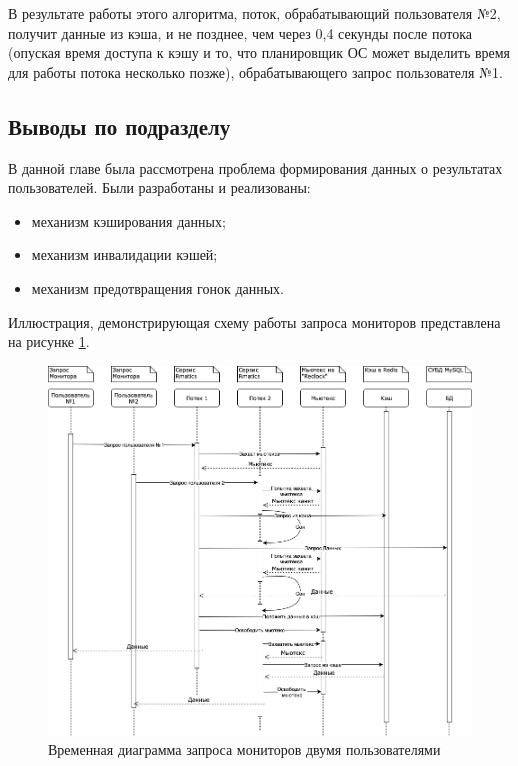 В результате работы этого алгоритма, поток, обрабатывающий пользователя №2,
получит данные из кэша, 
и не позднее, чем через 0,4 секунды после потока (опуская время доступа к кэшу и то, что планировщик ОС может выделить время для работы потока несколько позже), обрабатывающего запрос пользователя №1.

\subsection{Выводы по подразделу}

В данной главе была рассмотрена проблема формирования данных о результатах пользователей.
Были разработаны и реализованы:

\begin{itemize}
    \item механизм кэширования данных;
    \item механизм инвалидации кэшей;
    \item механизм предотвращения гонок данных.
\end{itemize}

Иллюстрация, демонстрирующая схему работы запроса мониторов представлена на рисунке \ref{fig:cache_system}.

\begin{figure}
  \centering
  \includegraphics[width=\textwidth]{figures/cache_system.png}
  \caption{Временная диаграмма запроса мониторов двумя пользователями}
  \label{fig:cache_system}
\end{figure}
